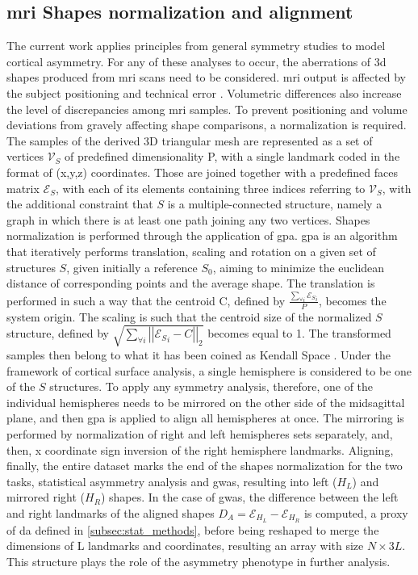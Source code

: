 \subsection{\Ac{mri} Shapes normalization and alignment}\label{subsec:shape_normalization}
The current work applies principles from general symmetry studies to model cortical asymmetry. For any of these analyses to occur, the aberrations of \ac{3d} shapes produced from \ac{mri} scans need to be considered. \Ac{mri} output is affected by the subject positioning and technical error \cite{Wittens2021}.  Volumetric differences also increase the level of discrepancies among \ac{mri} samples.  To prevent positioning and volume deviations from gravely affecting shape comparisons, a normalization is required\cite{Klingenberg2020}. The samples of the derived 3D triangular mesh are represented as a set of vertices $\mathcal{V}_S$ of predefined dimensionality P, with a single landmark coded in the format of (x,y,z) coordinates. Those are joined together with a predefined faces matrix $\mathcal{E}_S$, with each of its elements containing three indices referring to $\mathcal{V}_S$, with the additional constraint that $S$ is a multiple-connected structure, namely a graph in which there is at least one path joining any two vertices. Shapes normalization is performed through the application of \ac{gpa}. \Ac{gpa} is an algorithm that iteratively performs translation, scaling and rotation on a given set of structures $S$, given initially a reference $S_0$, aiming to minimize the euclidean distance of corresponding points and the average shape. The translation is performed in such a way that the centroid C, defined by $\frac{\sum_{\forall i}{\mathcal{E}_S}_i}{P}$, becomes the system origin. The scaling is such that the centroid size of the normalized $S$ structure, defined by $\sqrt{\sum_{\forall i}{\left|\left|{\mathcal{E}_S}_i-C\right|\right|_2}}$ becomes equal to 1. The transformed samples then belong to what it has been coined as Kendall Space \cite{Klingenberg2020}.  Under the framework of cortical surface analysis, a single hemisphere is considered to be one of the $S$ structures. To apply any symmetry analysis, therefore, one of the individual hemispheres needs to be mirrored on the other side of the midsagittal plane, and then \ac{gpa} is applied to align all hemispheres at once. The mirroring is performed by normalization of right and left hemispheres sets separately, and, then, x coordinate sign inversion of the right hemisphere landmarks. Aligning, finally, the entire dataset marks the end of the shapes normalization for the two tasks, statistical asymmetry analysis and \ac{gwas}, resulting into left ($H_L$) and mirrored right ($H_R$) shapes. In the case of \ac{gwas}, the difference between the left and right landmarks of the aligned shapes $D_A=\mathcal{E}_{H_L}-\mathcal{E}_{H_R}$ is computed, a proxy of \ac{da} defined in \autoref{subsec:stat_methods}, before being reshaped to merge the dimensions of L landmarks and coordinates, resulting an array with size $N\times3L$. This structure plays the role of the asymmetry phenotype in further analysis. 

